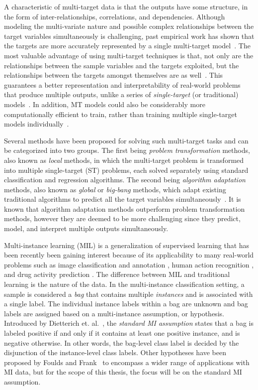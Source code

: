 \documentclass[reqno]{vcuthesis}
\numberwithin{equation}{chapter}
\begin{document}
A characteristic of multi-target data is that the outputs have some structure, in the form of inter-relationships, correlations, and dependencies. Although modeling the multi-variate nature and possible complex relationships between the target variables simultaneously is challenging, past empirical work has shown that the targets are more accurately represented by a single multi-target model~\cite{Caruana1997,Evgeniou2005}. The most valuable advantage of using multi-target techniques is that, not only are the relationships between the sample variables and the targets exploited, but the relationships between the targets amongst themselves are as well~\cite{Baxter1997,Caruana1997}. This guarantees a better representation and interpretability of real-world problems that produce multiple outputs, unlike a series of \textit{single-target} (or traditional) models~\cite{BenDavic2003}. In addition, MT models could also be considerably more computationally efficient to train, rather than training multiple single-target models individually~\cite{evgeniou2004regularized}. 

Several methods have been proposed for solving such multi-target tasks and can be categorized into two groups. The first being \textit{problem transformation} methods, also known as \textit{local} methods, in which the multi-target problem is transformed into multiple single-target (ST) problems, each solved separately using standard classification and regression algorithms. The second being \textit{algorithm adaptation} methods, also known as \textit{global} or \textit{big-bang} methods, which adapt existing traditional algorithms to predict all the target variables simultaneously~\cite{Borchani2015}. It is known that algorithm adaptation methods outperform problem transformation methods, however they are deemed to be more challenging since they predict, model, and interpret multiple outputs simultaneously. 

Multi-instance learning (MIL) is a generalization of supervised learning that has been recently been gaining interest because of its applicability to many real-world problems such as image classification and annotation \cite{Herman2008}, human action recognition \cite{Yi2016}, and drug activity prediction \cite{Dietterich1997}. The difference between MIL and traditional learning is the nature of the data. In the multi-instance classification setting, a sample is considered a \textit{bag} that contains multiple \textit{instances} and is associated with a single label. The individual instance labels within a bag are unknown and bag labels are assigned based on a multi-instance assumption, or hypothesis. Introduced by Dietterich et. al.~\cite{Dietterich1997}, the \textit{standard MI assumption} states that a bag is labeled positive if and only if it contains at least one positive instance, and is negative otherwise. In other words, the bag-level class label is decided by the disjunction of the instance-level class labels. Other hypotheses have been proposed by Foulds and Frank~\cite{Foulds2010} to encompass a wider range of applications with MI data, but for the scope of this thesis, the focus will be on the standard MI assumption. 
\end{document}
